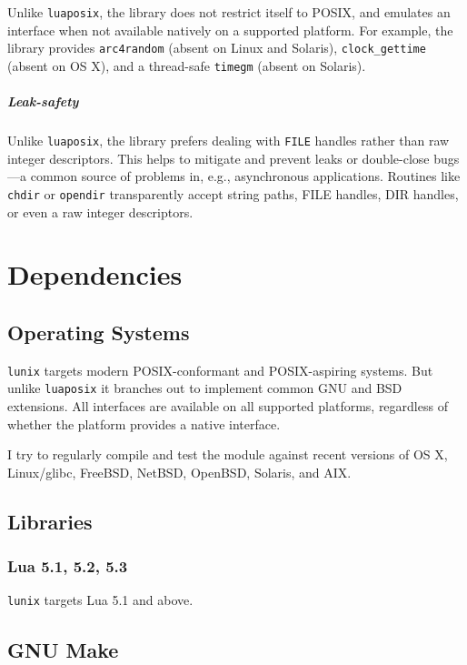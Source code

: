 \documentclass[11pt, oneside]{memoir}
\newcommand*{\lunix}[0]{\texttt{lunix}\xspace}
\newcommand*{\luaposix}[0]{\texttt{luaposix}\xspace}
\newcommand*{\fn}[1]{\texttt{#1}\xspace}
\newcommand*{\const}[1]{\texttt{#1}\xspace}
\begin{document}
Unlike \luaposix, the library does not restrict itself to POSIX, and emulates an interface when not available natively on a supported platform. For example, the library provides \fn{arc4random} (absent on Linux and Solaris), \fn{clock\_gettime} (absent on OS X), and a thread-safe \fn{timegm} (absent on Solaris).

\paragraph{Leak-safety}

Unlike \luaposix, the library prefers dealing with \const{FILE} handles rather than raw integer descriptors. This helps to mitigate and prevent leaks or double-close bugs---a common source of problems in, e.g., asynchronous applications. Routines like \fn{chdir} or \fn{opendir} transparently accept string paths, FILE handles, DIR handles, or even a raw integer descriptors.

\chapter{Dependencies}

\section{Operating Systems}

\lunix targets modern POSIX-conformant and POSIX-aspiring systems. But unlike \texttt{luaposix} it branches out to implement common GNU and BSD extensions. All interfaces are available on all supported platforms, regardless of whether the platform provides a native interface.

I try to regularly compile and test the module against recent versions of OS X, Linux/glibc, FreeBSD, NetBSD, OpenBSD, Solaris, and AIX.

\section{Libraries}

\subsection{Lua 5.1, 5.2, 5.3}

\lunix targets Lua 5.1 and above.

\section{GNU Make}
\end{document}
